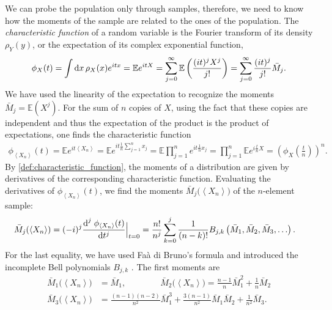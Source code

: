 \documentclass[11pt,a4paper]{article}
\renewcommand{\d}{\textnormal{d}}
\renewcommand{\|}{\rule[-0.4ex]{0.2ex}{1.2em}}
\begin{document}
We can probe the population only through samples, therefore, we need to know how the moments of the sample are related to the ones of the population.  
The \emph{characteristic function} of a random variable is the Fourier transform of its density $\rho_Y(y)$, or the expectation of its complex exponential function,
\begin{align}\label{def:characteristic_function}
	\phi_X(t) = \int \d x \, \rho_X(x) e^{itx} =\mathbb E e^{itX}   = \sum_{j=0}^\infty  \mathbb E\left(  \frac{(it)^j X^j}{j!} \right)   =\sum_{j=0}^\infty   \frac{(it)^j}{j!} \bar M_j.
\end{align}
We have used the linearity of the expectation to recognize the   moments $\bar M_j=\mathbb E(X^j)$.
For the sum of $n$ copies of $X$, using the fact that these copies are independent and thus the expectation of the product is the product of expectations, one finds the characteristic function
\begin{align*}
	\phi_{\left \langle X_n \right \rangle  }(t)=  \mathbb E e^{it \left \langle X_n \right \rangle  }=\mathbb E e^{it \frac 1 n \sum_{j=1}^n x_j}  = \mathbb E \prod_{j=1}^n e^{it\frac 1 n x_j}   = \prod_{j=1}^n \mathbb E e^{i \frac t n X}   = \left( \phi_X\left(\frac t n\right) \right) ^n.
\end{align*}
By \cref{def:characteristic_function}, the moments of a distribution are given by derivatives of the corresponding characteristic function. Evaluating the derivatives of $\phi_{\left \langle X_n \right \rangle  }(t)$, we find the moments $\bar M_j\big(\left \langle X_n \right \rangle  \big)$ of the $n$-element sample:  
\begin{align}\label{sample_mean_moments}
	\bar M_j(  \left \langle X_n \right \rangle  ) &= (-i)^j\frac{\d^j \; \phi_{\left \langle X_n \right \rangle  }(t)}{\d t^j} \Big|_{t=0} =  \frac{n!}{n^j}\sum_{k=0}^j \frac{1}{(n-k)!}B_{j,k}\left( \bar M_1 ,   \bar M_2 ,  \bar M_3  , \ldots  \right)  .
\end{align}
For the last equality, we have used  Fa\`{a} di Bruno's formula \cite{johnson_curious_2002} and introduced the incomplete Bell polynomials  $B_{j,k}$ \cite{bell_exponential_1934}. The first moments are
\begin{align}\label{sample_moments_relations}
	\bar M_1 \big( \left \langle X_n \right \rangle   \big) &= \bar M_1, \qquad \qquad \bar M_2 \big( \left \langle X_n \right \rangle  \big)  = \frac{n-1}{n} \bar M_1^2 + \frac 1 n \bar M_2 \\
	\bar M_3 \big(\left \langle X_n \right \rangle  \big) &= \frac{(n-1)(n-2)}{n^2} \bar M_1^3 +   \frac{3(n-1)}{n^2} \bar M_1 \bar M_2 + \frac{1}{n^2} \bar M_3. \nonumber
\end{align}
\end{document}
